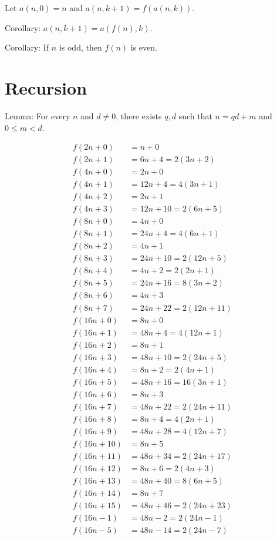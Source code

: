 Let \(a(n,0) = n\) and \(a(n,k+1) = f(a(n,k))\).

Corollary: \(a(n,k+1) = a(f(n),k)\).

Corollary: If \(n\) is odd, then \(f(n)\) is even.

\section{Recursion}

Lemma: For every \(n\) and \(d \neq 0\), there exists \(q,d\) such that \(n = qd+m\) and \(0 \le m < d\).

\begin{align*}
    f(2n+0) &= n+0
    \\
    f(2n+1) &= 6n+4 = 2(3n+2)
    \\
    f(4n+0) &= 2n+0
    \\
    f(4n+1) &= 12n+4 = 4(3n+1)
    \\
    f(4n+2) &= 2n+1
    \\
    f(4n+3) &= 12n+10 = 2(6n+5)
    \\
    f(8n+0) &= 4n+0
    \\
    f(8n+1) &= 24n+4 = 4(6n+1)
    \\
    f(8n+2) &= 4n+1
    \\
    f(8n+3) &= 24n+10 = 2(12n+5)
    \\
    f(8n+4) &= 4n+2 = 2(2n+1)
    \\
    f(8n+5) &= 24n+16 = 8(3n+2)
    \\
    f(8n+6) &= 4n+3
    \\
    f(8n+7) &= 24n+22 = 2(12n+11)
    \\
    f(16n+0) &= 8n+0
    \\
    f(16n+1) &= 48n+4 = 4(12n+1)
    \\
    f(16n+2) &= 8n+1
    \\
    f(16n+3) &= 48n+10 = 2(24n+5)
    \\
    f(16n+4) &= 8n+2 = 2(4n+1)
    \\
    f(16n+5) &= 48n+16 = 16(3n+1)
    \\
    f(16n+6) &= 8n+3
    \\
    f(16n+7) &= 48n+22 = 2(24n+11)
    \\
    f(16n+8) &= 8n+4 = 4(2n+1)
    \\
    f(16n+9) &= 48n+28 = 4(12n+7)
    \\
    f(16n+10) &= 8n+5
    \\
    f(16n+11) &= 48n+34 = 2(24n+17)
    \\
    f(16n+12) &= 8n+6 = 2(4n+3)
    \\
    f(16n+13) &= 48n+40 = 8(6n+5)
    \\
    f(16n+14) &= 8n+7
    \\
    f(16n+15) &= 48n+46 = 2(24n+23)
    \\
    f(16n-1) &= 48n-2 = 2(24n-1)
    \\
    f(16n-5) &= 48n-14 = 2(24n-7)
\end{align*}

